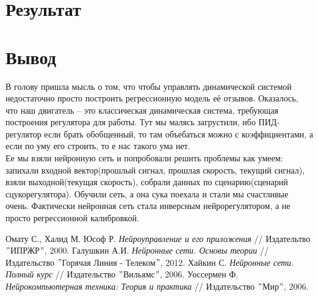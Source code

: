\documentclass[14pt]{extreport}
\begin{document}
        \section{Результат}
        \section{Вывод}


            В голову пришла мысль о том, что чтобы управлять динамической системой недостаточно просто построить регрессионную модель её отзывов. Оказалось, что наш двигатель -- это классическая динамическая система, требующая построения регулятора для работы. Тут мы малясь загрустили, ибо ПИД-регулятор если брать обобщенный, то там объебаться можно с коэффициентами, а если по уму его строить, то е нас такого ума нет.\\
            Ее мы взяли нейронную сеть и попробовали решить проблемы как умеем: запихали входной вектор(прошлый сигнал, прошлая скорость, текущий сигнал), взяли выходной(текущая скорость), собрали данных по сценарию(сценарий сцукорегулятора). Обучили сеть, а она сука поехала и стали мы счастливые очень. Фактически нейронная сеть стала инверсным нейрорегулятором, а не просто регрессионной калибровкой.
\newpage
        \begin{thebibliography}{99}
             Омату С., Халид М. Юсоф Р. {\it Нейроуправление и его приложения} // Издательтво $"$ИПРЖР$"$, 2000.
             Галушкин А.И. {\it Нейронные сети. Основы теории} // Издательство $"$Горячая Линия - Телеком$"$, 2012.
             Хайкин С. {\it Нейронные сети. Полный курс} // Издательство $"$Вильямс$"$, 2006.
             Уоссермен Ф. {\it Нейрокомпьютерная техника: Теория и практика} // Издательство $"$Мир$"$, 2006.
        \end{thebibliography}
\end{document}
